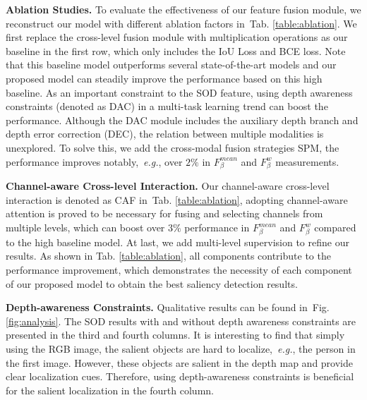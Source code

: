 \documentclass[journal]{IEEEtran}
\def\eg{{\em e.g.}}
\newcommand{\figref}[1]{Fig. \ref{#1}}
\newcommand{\tabref}[1]{Tab. \ref{#1}}
\begin{document}
\textbf{Ablation Studies.} To evaluate the effectiveness of our feature fusion module, we reconstruct our model with different ablation factors in~\tabref{table:ablation}. We first replace the cross-level fusion module with multiplication operations as our baseline in the first row, which only includes the IoU Loss and BCE loss. Note that this baseline model outperforms several state-of-the-art models and our proposed model can steadily improve the performance based on this high baseline.
As an important constraint to the SOD feature, using depth awareness constraints (denoted as DAC) in a multi-task learning trend can boost the performance. Although the DAC module includes the auxiliary depth branch and depth error correction (DEC), the relation between multiple modalities is unexplored.
To solve this, we add the cross-modal fusion strategies SPM, the performance improves notably,~\eg, over $2\%$ in $F_\beta^{mean}$ and $F_\beta^{w}$ measurements.

\textbf{Channel-aware Cross-level Interaction.} Our channel-aware cross-level interaction is denoted as CAF in~\tabref{table:ablation}, adopting channel-aware attention is proved to be necessary for fusing and selecting channels from multiple levels, which can boost over $3\%$ performance in $F_\beta^{mean}$ and $F_\beta^{w}$ compared to the high baseline model.
At last, we add multi-level supervision to refine our results. As shown in \tabref{table:ablation}, all components contribute to the performance improvement, which demonstrates the necessity of each component of our proposed model to obtain the best saliency detection results.

\textbf{Depth-awareness Constraints.} Qualitative results can be found in~\figref{fig:analysis}. The SOD results with and without depth awareness constraints are presented in the third and fourth columns. It is interesting to find that simply using the RGB image, the salient objects are hard to localize,~\eg, the person in the first image. However, these objects are salient in the depth map and provide clear localization cues. Therefore, using depth-awareness constraints is beneficial for the salient localization in the fourth column.
\end{document}
